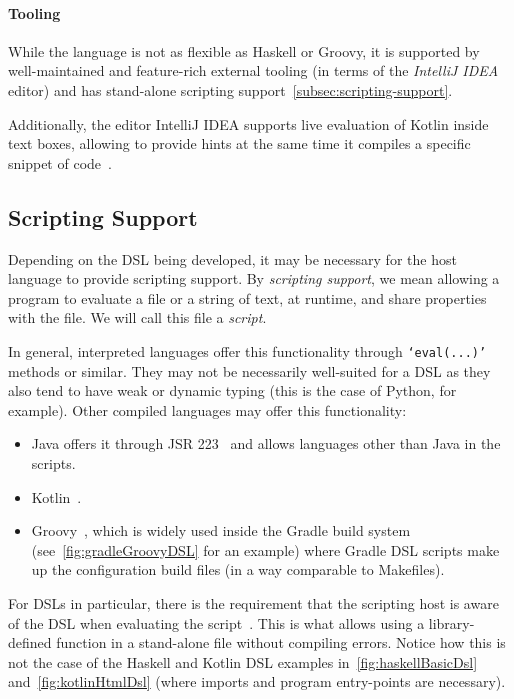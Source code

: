 \paragraph{Tooling} While the language is not as flexible as Haskell or Groovy, it is supported by well-maintained and feature-rich external tooling (in terms of the \textit{IntelliJ IDEA} editor) and has stand-alone scripting support~\autoref{subsec:scripting-support}.

Additionally, the editor IntelliJ IDEA supports live evaluation of Kotlin inside text boxes, allowing to provide hints at the same time it compiles a specific snippet of code~\cite{intelliJRepo}.

\subsection{Scripting Support}\label{subsec:scripting-support}

Depending on the DSL being developed, it may be necessary for the host language to provide scripting support.
By \emph{scripting support}, we mean allowing a program to evaluate a file or a string of text, at runtime, and share properties with the file.
We will call this file a \emph{script}.

In general, interpreted languages offer this functionality through \texttt{`eval(...)'} methods or similar.
They may not be necessarily well-suited for a DSL as they also tend to have weak or dynamic typing (this is the case of Python, for example).
Other compiled languages may offer this functionality:
\begin{itemize}
    \item Java offers it through JSR 223~\cite{javaScripting} and allows languages other than Java in the scripts.
    \item Kotlin~\cite{kotlinScriptKeep}.
    \item Groovy~\cite{groovyScripting}, which is widely used inside the Gradle build system (see~\autoref{fig:gradleGroovyDSL} for an example) where Gradle DSL scripts make up the configuration build files (in a way comparable to Makefiles).
\end{itemize}

For DSLs in particular, there is the requirement that the scripting host is aware of the DSL when evaluating the script~\cite{kotlinScriptKeep}.
This is what allows using a library-defined function in a stand-alone file without compiling errors.
Notice how this is not the case of the Haskell and Kotlin DSL examples in~\autoref{fig:haskellBasicDsl} and~\autoref{fig:kotlinHtmlDsl} (where imports and program entry-points are necessary).


